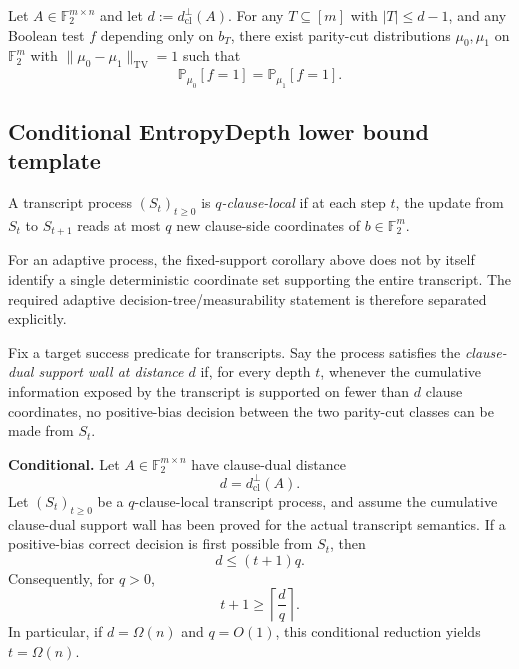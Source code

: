 \begin{corollary}
Let $A\in \mathbb{F}_2^{m\times n}$ and let $d := d^\perp_{\mathrm{cl}}(A)$.
For any $T\subseteq [m]$ with $|T|\le d-1$, and any Boolean test $f$ depending only on $b_T$, there exist parity-cut distributions $\mu_0,\mu_1$ on $\mathbb{F}_2^m$ with $\|\mu_0-\mu_1\|_{\mathrm{TV}}=1$ such that
\[
\mathbb{P}_{\mu_0}[f=1]=\mathbb{P}_{\mu_1}[f=1].
\]
\end{corollary}

\subsection{Conditional EntropyDepth lower bound template}

\begin{definition}
A transcript process $(S_t)_{t\ge 0}$ is \emph{$q$-clause-local} if at each step $t$, the update from $S_t$ to $S_{t+1}$ reads at most $q$ new clause-side coordinates of $b\in\mathbb{F}_2^m$.
\end{definition}

For an adaptive process, the fixed-support corollary above does not by itself identify a single deterministic coordinate set supporting the entire transcript.  The required adaptive decision-tree/measurability statement is therefore separated explicitly.

\begin{definition}
Fix a target success predicate for transcripts.  Say the process satisfies the \emph{clause-dual support wall at distance $d$} if, for every depth $t$, whenever the cumulative information exposed by the transcript is supported on fewer than $d$ clause coordinates, no positive-bias decision between the two parity-cut classes can be made from $S_t$.
\end{definition}

\begin{theorem}
\textbf{Conditional.}
Let $A\in\mathbb F_2^{m\times n}$ have clause-dual distance
\[
d=d^\perp_{\mathrm{cl}}(A).
\]
Let $(S_t)_{t\ge0}$ be a $q$-clause-local transcript process, and assume the cumulative clause-dual support wall has been proved for the actual transcript semantics.
If a positive-bias correct decision is first possible from $S_t$, then
\[
d\le (t+1)q.
\]
Consequently, for $q>0$,
\[
t+1\ge \left\lceil\frac d q\right\rceil.
\]
In particular, if $d=\Omega(n)$ and $q=O(1)$, this conditional reduction yields $t=\Omega(n)$.
\end{theorem}

